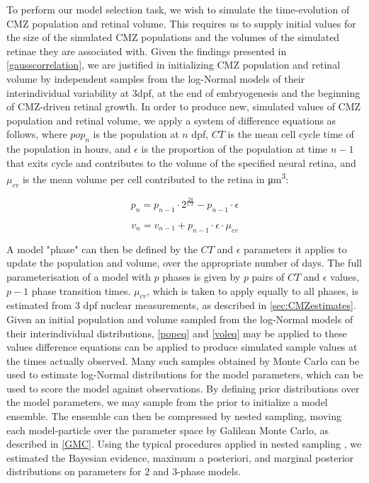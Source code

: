To perform our model selection task, we wish to simulate the time-evolution of CMZ population and retinal volume. This requires us to supply initial values for the size of the simulated CMZ populations and the volumes of the simulated retinae they are associated with. Given the findings presented in \autoref{gausscorrelation}, we are justified in initializing CMZ population and retinal volume by independent samples from the log-Normal models of their interindividual variability at 3dpf, at the end of embryogenesis and the beginning of CMZ-driven retinal growth. In order to produce new, simulated values of CMZ population and retinal volume, we apply a system of difference equations as follows, where $pop_n$ is the population at $n$ dpf, $CT$ is the mean cell cycle time of the population in hours, and $\epsilon$ is the proportion of the population at time $n-1$ that exits cycle and contributes to the volume of the specified neural retina, and $\mu_{cv}$ is the mean volume per cell contributed to the retina in \si{\cubic\micro\metre}:

\begin{equation}
    p_n=p_{n-1} \cdot 2^{\frac{24}{CT}} - p_{n-1} \cdot \epsilon
    \label{popeq}
\end{equation}

\begin{equation}
    v_n=v_{n-1} + p_{n-1} \cdot \epsilon \cdot \mu_{cv}
    \label{voleq}
\end{equation}

A model "phase" can then be defined by the $CT$ and $\epsilon$ parameters it applies to update the population and volume, over the appropriate number of days. The full parameterisation of a model with $p$ phases is given by $p$ pairs of $CT$ and $\epsilon$ values, $p-1$ phase transition times. $\mu_{cv}$, which is taken to apply equally to all phases, is estimated from 3 dpf nuclear measurements, as described in \autoref{sec:CMZestimates}. Given an initial population and volume sampled from the log-Normal models of their interindividual distributions, \autoref{popeq} and \autoref{voleq} may be applied to these values difference equations can be applied to produce simulated sample values at the times actually observed. Many such samples obtained by Monte Carlo can be used to estimate log-Normal distributions for the model parameters, which can be used to score the model against observations. By defining prior distributions over the model parameters, we may sample from the prior to initialize a model ensemble. The ensemble can then be compressed by nested sampling, moving each model-particle over the parameter space by Galilean Monte Carlo, as described in \autoref{GMC}. Using the typical procedures applied in nested sampling \cite{Skilling2006}, we estimated the Bayesian evidence, maximum a posteriori, and marginal posterior distributions on parameters for 2 and 3-phase models.

